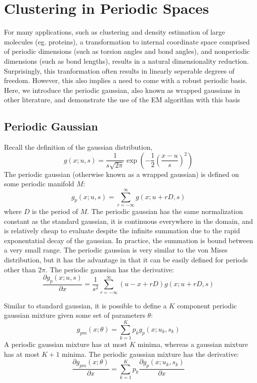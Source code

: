 \documentclass{acm_proc_article-sp}
\begin{document}
\section{Clustering in Periodic Spaces}

For many applications, such as clustering and density estimation of large molecules (eg. proteins), a transformation to internal coordinate space comprised of periodic dimensions (such as torsion angles and bond angles), and nonperiodic dimensions (such as bond lengths), results in a natural dimensionality reduction. Surprisingly, this tranformation often results in linearly seperable degrees of freedom. However, this also implies a need to come with a robust periodic basis. Here, we introduce the periodic gaussian, also known as wrapped gaussians in other literature, and demonstrate the use of the EM algorithm with this basis

\subsection{Periodic Gaussian}
Recall the definition of the gaussian distribution,
\begin{equation}
g(x; u,s) = \dfrac{1}{s\sqrt{2\pi}} \exp\left(-\dfrac{1}{2} \left(\dfrac{x-u}{s}\right)^2\right)
\end{equation}
The periodic gaussian (otherwise known as a wrapped gaussian) is defined on some periodic manifold \textbf{$M$}:
\begin{equation}
g_p(x; u,s) = \sum_{r=-\infty}^{\infty} g(x; u+rD, s)
\end{equation}
where \textbf{$D$} is the period of \textbf{$M$}. The periodic gaussian has the same normalization constant as the standard gaussian, it is continuous everywhere in the domain, and is relatively cheap to evaluate despite the infinite summation due to the rapid exponentatial decay of the gaussian. In practice, the summation is bound between a very small range. The periodic gaussian is very similar to the von Mises distribution, but it has the advantage in that it can be easily defined for periods other than \textbf{$2\pi$}. The periodic gaussian has the derivative:
\begin{equation}
\dfrac{\partial g_p(x;u,s)}{\partial x} = \dfrac{1}{s^2} \sum_{r=-\infty}^{\infty} (u-x+rD) g(x; u+rD, s)
\end{equation}

Similar to standard gaussian, it is possible to define a \textbf{$K$} component periodic gaussian mixture given some set of parameters \textbf{$\theta$}:
\begin{equation}
g_{pm}(x;\theta) = \sum_{k=1}^{K} p_k g_p(x; u_k, s_k)
\end{equation}
A periodic gaussian mixture has at most \textbf{$K$} minima, whereas a gaussian mixture has at most \textbf{$K+1$} minima. The periodic gaussian mixture has the derivative:
\begin{equation}
\dfrac{\partial g_{pm}(x; \theta)}{\partial x} =  \sum_{k=1}^{K} p_k \dfrac{\partial g_p(x; u_k, s_k)}{\partial x}
\end{equation}
\end{document}
